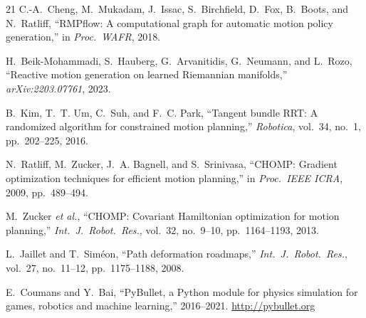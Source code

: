 \documentclass[journal]{IEEEtran}
\begin{document}
\begin{thebibliography}{21}
C.-A.~Cheng, M.~Mukadam, J.~Issac, S.~Birchfield, D.~Fox, B.~Boots,
and N.~Ratliff,
``RMPflow: A computational graph for automatic motion policy
generation,''
in \emph{Proc.\ WAFR}, 2018.

H.~Beik-Mohammadi, S.~Hauberg, G.~Arvanitidis, G.~Neumann, and
L.~Rozo,
``Reactive motion generation on learned Riemannian manifolds,''
\emph{arXiv:2203.07761}, 2023.

B.~Kim, T.~T. Um, C.~Suh, and F.~C. Park,
``Tangent bundle RRT: A randomized algorithm for constrained motion
planning,''
\emph{Robotica}, vol.~34, no.~1, pp.~202--225, 2016.

N.~Ratliff, M.~Zucker, J.~A. Bagnell, and S.~Srinivasa,
``CHOMP: Gradient optimization techniques for efficient motion
planning,''
in \emph{Proc.\ IEEE ICRA}, 2009, pp.~489--494.

M.~Zucker \emph{et al.},
``CHOMP: Covariant Hamiltonian optimization for motion planning,''
\emph{Int.\ J.\ Robot.\ Res.}, vol.~32, no.~9--10, pp.~1164--1193, 2013.

L.~Jaillet and T.~Sim\'{e}on,
``Path deformation roadmaps,''
\emph{Int.\ J.\ Robot.\ Res.}, vol.~27, no.~11--12, pp.~1175--1188, 2008.

E.~Coumans and Y.~Bai,
``PyBullet, a Python module for physics simulation for games,
robotics and machine learning,'' 2016--2021.
\url{http://pybullet.org}

\end{thebibliography}
\end{document}
